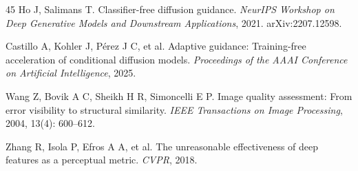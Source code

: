 \documentclass[times,twocolumn,final]{elsarticle}
\begin{document}
\begin{thebibliography}{45}
Ho J, Salimans T. Classifier-free diffusion guidance. \textit{NeurIPS Workshop on Deep Generative Models and Downstream Applications}, 2021. arXiv:2207.12598.

Castillo A, Kohler J, P\'erez J C, et al. Adaptive guidance: Training-free acceleration of conditional diffusion models. \textit{Proceedings of the AAAI Conference on Artificial Intelligence}, 2025.

Wang Z, Bovik A C, Sheikh H R, Simoncelli E P. Image quality assessment: From error visibility to structural similarity. \textit{IEEE Transactions on Image Processing}, 2004, 13(4): 600--612.

Zhang R, Isola P, Efros A A, et al. The unreasonable effectiveness of deep features as a perceptual metric. \textit{CVPR}, 2018.

\end{thebibliography}
\endgroup
\end{document}
